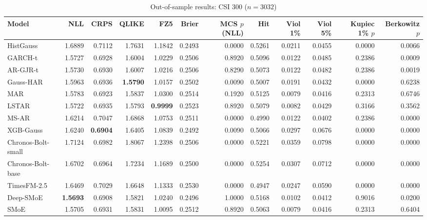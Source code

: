 \begin{table}[!htbp]\centering\scriptsize
\caption{Out-of-sample results: CSI 300 ($n=3032$)}\label{tab:asset_csi300}
\begin{adjustbox}{max width=\textwidth}
\begin{tabular}{lrrrrrrrrrrr}
\toprule
Model & NLL & CRPS & QLIKE & FZ5 & Brier & MCS $p$ (NLL) & Hit & Viol 1\% & Viol 5\% & Kupiec 1\% $p$ & Berkowitz $p$\\
\midrule
HistGauss & 1.6889 & 0.7112 & 1.7631 & 1.1842 & 0.2493 & 0.0000 & 0.5261 & 0.0211 & 0.0455 & 0.0000 & 0.0066\\
GARCH-t & 1.5727 & 0.6928 & 1.6004 & 1.0229 & 0.2506 & 0.8920 & 0.5096 & 0.0122 & 0.0485 & 0.2386 & 0.0009\\
AR-GJR-t & 1.5730 & 0.6930 & 1.6007 & 1.0216 & 0.2506 & 0.8290 & 0.5073 & 0.0122 & 0.0482 & 0.2386 & 0.0019\\
Gauss-HAR & 1.5963 & 0.6936 & \textbf{1.5790} & 1.0157 & 0.2502 & 0.0090 & 0.5007 & 0.0191 & 0.0432 & 0.0000 & 0.6238\\
MAR & 1.5783 & 0.6923 & 1.5837 & 1.0300 & 0.2514 & 0.1920 & 0.5125 & 0.0079 & 0.0416 & 0.2313 & 0.6746\\
LSTAR & 1.5722 & 0.6935 & 1.5793 & \textbf{0.9999} & 0.2523 & 0.8920 & 0.5079 & 0.0082 & 0.0429 & 0.3166 & 0.3562\\
MS-AR & 1.6214 & 0.7047 & 1.6868 & 1.0753 & 0.2511 & 0.0000 & 0.4990 & 0.0122 & 0.0402 & 0.2386 & 0.0000\\
XGB-Gauss & 1.6240 & \textbf{0.6904} & 1.6405 & 1.0839 & 0.2492 & 0.0090 & 0.5066 & 0.0297 & 0.0676 & 0.0000 & 0.0000\\
Chronos-Bolt-small & 1.7124 & 0.6982 & 1.8067 & 1.2398 & 0.2506 & 0.0000 & 0.5221 & 0.0359 & 0.0798 & 0.0000 & 0.0000\\
Chronos-Bolt-base & 1.6702 & 0.6964 & 1.7234 & 1.1689 & 0.2500 & 0.0000 & 0.5254 & 0.0307 & 0.0712 & 0.0000 & 0.0000\\
TimesFM-2.5 & 1.6469 & 0.7029 & 1.6648 & 1.1333 & 0.2530 & 0.0000 & 0.4947 & 0.0247 & 0.0590 & 0.0000 & 0.0000\\
Deep-SMoE & \textbf{1.5693} & 0.6908 & 1.5821 & 1.0240 & 0.2496 & 1.0000 & 0.5168 & 0.0102 & 0.0412 & 0.9016 & 0.0200\\
SMoE & 1.5705 & 0.6931 & 1.5831 & 1.0095 & 0.2512 & 0.8920 & 0.5063 & 0.0079 & 0.0416 & 0.2313 & 0.6404\\
\bottomrule
\end{tabular}
\end{adjustbox}
\end{table}